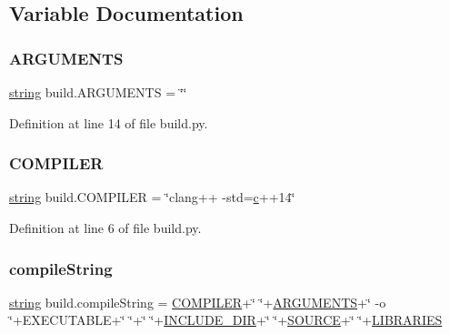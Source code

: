 \subsection{Variable Documentation}
\mbox{\label{namespacebuild_a1bf544daac24c8c493f0bcab1fdddd32}} 
\subsubsection{\texorpdfstring{ARGUMENTS}{ARGUMENTS}}
{\footnotesize\ttfamily \mbox{\hyperlink{_s_d_l__opengl__glext_8h_ae84541b4f3d8e1ea24ec0f466a8c568b}{string}} build.\+A\+R\+G\+U\+M\+E\+N\+TS = \char`\"{}\char`\"{}}



Definition at line 14 of file build.\+py.

\mbox{\label{namespacebuild_aa75f224fbf929d8e46d1d31968ee6451}} 
\subsubsection{\texorpdfstring{COMPILER}{COMPILER}}
{\footnotesize\ttfamily \mbox{\hyperlink{_s_d_l__opengl__glext_8h_ae84541b4f3d8e1ea24ec0f466a8c568b}{string}} build.\+C\+O\+M\+P\+I\+L\+ER = \char`\"{}clang++ -\/std=\mbox{\hyperlink{_s_d_l__opengl__glext_8h_a1f2d7f8147412c43ba2303a56f97ee73}{c}}++14\char`\"{}}



Definition at line 6 of file build.\+py.

\mbox{\label{namespacebuild_aad7d648a6e7eb1f6b36140a180580b24}} 
\subsubsection{\texorpdfstring{compileString}{compileString}}
{\footnotesize\ttfamily \mbox{\hyperlink{_s_d_l__opengl__glext_8h_ae84541b4f3d8e1ea24ec0f466a8c568b}{string}} build.\+compile\+String = \mbox{\hyperlink{namespacebuild_aa75f224fbf929d8e46d1d31968ee6451}{C\+O\+M\+P\+I\+L\+ER}}+\char`\"{} \char`\"{}+\mbox{\hyperlink{namespacebuild_a1bf544daac24c8c493f0bcab1fdddd32}{A\+R\+G\+U\+M\+E\+N\+TS}}+\char`\"{} -\/o \char`\"{}+E\+X\+E\+C\+U\+T\+A\+B\+LE+\char`\"{} \char`\"{}+\char`\"{} \char`\"{}+\mbox{\hyperlink{namespacebuild_a5d6144bd70c120b901b0047a008b89ad}{I\+N\+C\+L\+U\+D\+E\+\_\+\+D\+IR}}+\char`\"{} \char`\"{}+\mbox{\hyperlink{namespacebuild_a832e50b60ae1bc20032caf0540c2176b}{S\+O\+U\+R\+CE}}+\char`\"{} \char`\"{}+\mbox{\hyperlink{namespacebuild_a88bc45090f5d9a0b72dc833bfe64e032}{L\+I\+B\+R\+A\+R\+I\+ES}}}



